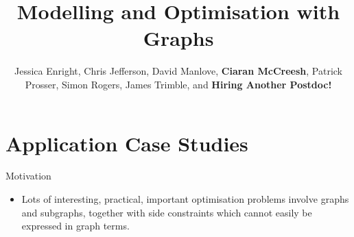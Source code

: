 \documentclass{beamer}
\author[Jessica Enright \and Chris Jefferson \and David Manlove \and Ciaran McCreesh \and Patrick Prosser \and Simon Rogers \and James Trimble]{
    Jessica Enright,
    Chris Jefferson,
    David Manlove,
    \textbf{Ciaran McCreesh},
    Patrick Prosser,
    Simon Rogers,
    James Trimble,
    and \textbf{Hiring Another Postdoc!}}
\title[Modelling and Optimisation with Graphs]{Modelling and Optimisation with Graphs}
\begin{document}
{
    \begin{frame}
        \titlepage
    \end{frame}
}

\section{Application Case Studies}

\begin{frame}{Motivation}
    \begin{itemize}
        \item Lots of interesting, practical, important optimisation problems involve graphs and
            subgraphs, together with side constraints which cannot easily be expressed in graph
            terms.
    \end{itemize}
\end{frame}
\end{document}
